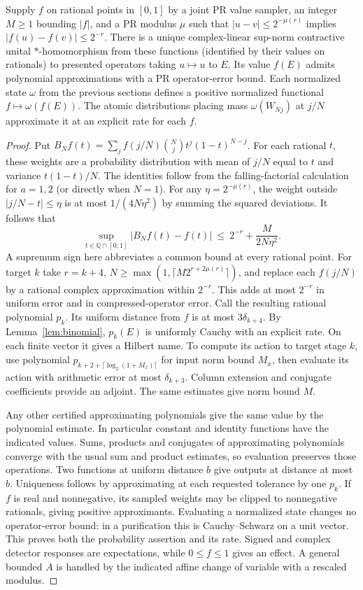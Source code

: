 \begin{theorem}\label{thm:calculus}
Supply $f$ on rational points in $[0,1]$ by a joint PR value sampler, an integer $M\ge1$ bounding $|f|$, and a PR modulus $\mu$ such that $|u-v|\le2^{-\mu(r)}$ implies $|f(u)-f(v)|\le2^{-r}$. There is a unique complex-linear sup-norm contractive unital $*$-homomorphism from these functions (identified by their values on rationals) to presented operators taking $u\mapsto u$ to $E$. Its value $f(E)$ admits polynomial approximations with a PR operator-error bound. Each normalized state $\omega$ from the previous sections defines a positive normalized functional $f\mapsto\omega(f(E))$. The atomic distributions placing mass $\omega(W_{Nj})$ at $j/N$ approximate it at an explicit rate for each $f$.
\end{theorem}
\begin{proof}
Put $B_N f(t)=\sum_j f(j/N){N\choose j}t^j(1-t)^{N-j}$. For each rational $t$, these weights are a probability distribution with mean of $j/N$ equal to $t$ and variance $t(1-t)/N$. The identities follow from the falling-factorial calculation for $a=1,2$ (or directly when $N=1$). For any $\eta=2^{-\mu(r)}$, the weight outside $|j/N-t|\le\eta$ is at most $1/(4N\eta^2)$ by summing the squared deviations. It follows that
\[
 \sup_{t\in\mathbb Q\cap[0,1]}|B_N f(t)-f(t)|\ \le\ 2^{-r}+\frac{M}{2N\eta^2}.
\]
A supremum sign here abbreviates a common bound at every rational point. For target $k$ take $r=k+4$, $N\ge\max(1,\lceil M2^{r+2\mu(r)}\rceil)$, and replace each $f(j/N)$ by a rational complex approximation within $2^{-r}$. This adds at most $2^{-r}$ in uniform error and in compressed-operator error. Call the resulting rational polynomial $p_k$. Its uniform distance from $f$ is at most $3\delta_{k+4}$. By Lemma~\ref{lem:binomial}, $p_k(E)$ is uniformly Cauchy with an explicit rate. On each finite vector it gives a Hilbert name. To compute its action to target stage $k$, use polynomial $p_{k+2+\lceil\log_2(1+M_x)\rceil}$ for input norm bound $M_x$, then evaluate its action with arithmetic error at most $\delta_{k+3}$. Column extension and conjugate coefficients provide an adjoint. The same estimates give norm bound $M$.

Any other certified approximating polynomials give the same value by the polynomial estimate. In particular constant and identity functions have the indicated values. Sums, products and conjugates of approximating polynomials converge with the usual sum and product estimates, so evaluation preserves those operations. Two functions at uniform distance $b$ give outputs at distance at most $b$. Uniqueness follows by approximating at each requested tolerance by one $p_k$. If $f$ is real and nonnegative, its sampled weights may be clipped to nonnegative rationals, giving positive approximants. Evaluating a normalized state changes no operator-error bound: in a purification this is Cauchy--Schwarz on a unit vector. This proves both the probability assertion and its rate. Signed and complex detector responses are expectations, while $0\le f\le1$ gives an effect. A general bounded $A$ is handled by the indicated affine change of variable with a rescaled modulus.
\end{proof}

